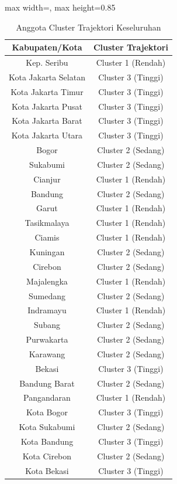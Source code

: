 \begin{table}[H]
\centering
\caption{Anggota Cluster Trajektori Keseluruhan} \label{tab:app2clustermembers}
\begin{adjustbox}{max width=\textwidth, max height=0.85\textheight}
\begin{tabular}{|c|c|}
\hline
\textbf{Kabupaten/Kota} & \textbf{Cluster Trajektori} \\
\hline
Kep. Seribu & Cluster 1 (Rendah) \\
Kota Jakarta Selatan & Cluster 3 (Tinggi) \\
Kota Jakarta Timur & Cluster 3 (Tinggi) \\
Kota Jakarta Pusat & Cluster 3 (Tinggi) \\
Kota Jakarta Barat & Cluster 3 (Tinggi) \\
Kota Jakarta Utara & Cluster 3 (Tinggi) \\
Bogor & Cluster 2 (Sedang) \\
Sukabumi & Cluster 2 (Sedang) \\
Cianjur & Cluster 1 (Rendah) \\
Bandung & Cluster 2 (Sedang) \\
Garut & Cluster 1 (Rendah) \\
Tasikmalaya & Cluster 1 (Rendah) \\
Ciamis & Cluster 1 (Rendah) \\
Kuningan & Cluster 2 (Sedang) \\
Cirebon & Cluster 2 (Sedang) \\
Majalengka & Cluster 1 (Rendah) \\
Sumedang & Cluster 2 (Sedang) \\
Indramayu & Cluster 1 (Rendah) \\
Subang & Cluster 2 (Sedang) \\
Purwakarta & Cluster 2 (Sedang) \\
Karawang & Cluster 2 (Sedang) \\
Bekasi & Cluster 3 (Tinggi) \\
Bandung Barat & Cluster 2 (Sedang) \\
Pangandaran & Cluster 1 (Rendah) \\
Kota Bogor & Cluster 3 (Tinggi) \\
Kota Sukabumi & Cluster 2 (Sedang) \\
Kota Bandung & Cluster 3 (Tinggi) \\
Kota Cirebon & Cluster 2 (Sedang) \\
Kota Bekasi & Cluster 3 (Tinggi) \\

\end{tabular}
\end{adjustbox}
\end{table}
